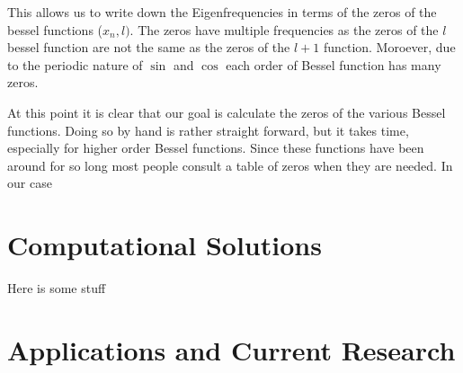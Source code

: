 This allows us to write down the Eigenfrequencies in terms of the zeros of the bessel functions ($x_n,l)$.
The zeros have multiple frequencies as the zeros of the $l$ bessel function are not the same as the zeros of the $l+1$ function. Moroever, due to the periodic nature of $\sin$ and $\cos$ each order of Bessel function has many zeros.

At this point it is clear that our goal is calculate the zeros of the various Bessel functions. Doing so by hand is rather straight forward, but it takes time, especially for higher order Bessel functions. Since these functions have been around for so long most people consult a table of zeros when they are needed. In our case

\section{Computational Solutions}
Here is some stuff


\section{Applications and Current Research}
